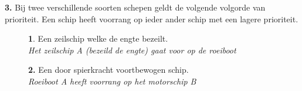 \textbf{3.} Bij twee verschillende soorten schepen geldt de volgende volgorde van prioriteit. Een schip heeft voorrang op ieder ander schip met een lagere prioriteit.
\vspace{-0.5cm}
\begin{figure}[H]
	\centering
	\hspace{0.02\textwidth}
	\begin{minipage}[t]{0.70\textwidth}
		\textbf{1}. Een zeilschip welke de engte bezeilt\footnotemark. \\
		\textit{Het zeilschip A (bezeild de engte) gaat voor op de roeiboot}
	\end{minipage}
	\hfill
	\begin{minipage}[t]{0.25\textwidth}
		\label{pic:engte:3}
	\end{minipage}
	\hfill
\end{figure}
\vspace{-0.7cm}

\begin{figure}[H]
	\centering
	\hspace{0.02\textwidth}
	\begin{minipage}[t]{0.70\textwidth}
		\textbf{2.} Een door spierkracht voortbewogen schip.\\
		\textit{Roeiboot A heeft voorrang op het motorschip B}
	\end{minipage}
	\hfill
	\begin{minipage}[t]{0.25\textwidth}
		\label{pic:engte:4}
	\end{minipage}
	\hfill
\end{figure}

